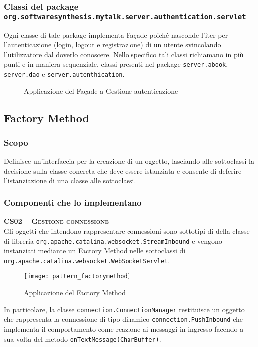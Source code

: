 \subsubsection*{Classi del package \texttt{org.softwaresynthesis.mytalk.server.authentication.servlet}}

Ogni classe di tale package implementa Façade poiché nasconde l'iter per l'autenticazione (login, logout  e registrazione) di un utente svincolando l'utilizzatore dal doverlo conoscere. Nello specifico tali classi richiamano in più punti e in maniera sequenziale, classi presenti nel package \texttt{server.abook}, \texttt{server.dao} e \texttt{server.autenthication}.

\begin{figure}[H]
  \centering
  \caption{Applicazione del  Façade a \textsf{Gestione autenticazione}}\label{fig:facademessage}
\end{figure}


\subsection{Factory Method}\label{sec:patternfactorymethod}

\subsubsection{Scopo}
Definisce un'interfaccia per la creazione di un oggetto, lasciando alle sottoclassi la decisione sulla classe concreta che deve essere istanziata e consente di deferire l'istanziazione di una classe alle sottoclassi.

\subsubsection{Componenti che lo implementano}
\begin{description}

  \item{\scshape\bfseries CS02 -- Gestione connessione}\\
Gli oggetti che intendono rappresentare connessioni sono sottotipi di della classe di libreria \texttt{org.apache.catalina.websocket.StreamInbound} e vengono instanziati mediante un Factory Method nelle sottoclassi di \texttt{org.apache.catalina.websocket.WebSocketServlet}.

\begin{figure}[H]
  \centering
  \texttt{[image: pattern\_factorymethod]}
  \caption{Applicazione del  Factory Method}\label{fig:factory_method}
\end{figure}

In particolare, la classe \texttt{connection.ConnectionManager} restituisce un oggetto che rappresenta la connessione di tipo dinamico \texttt{connection.PushInbound} che implementa il comportamento come reazione ai messaggi in ingresso facendo a sua volta  del metodo \texttt{onTextMessage(CharBuffer)}.
\end{description}

